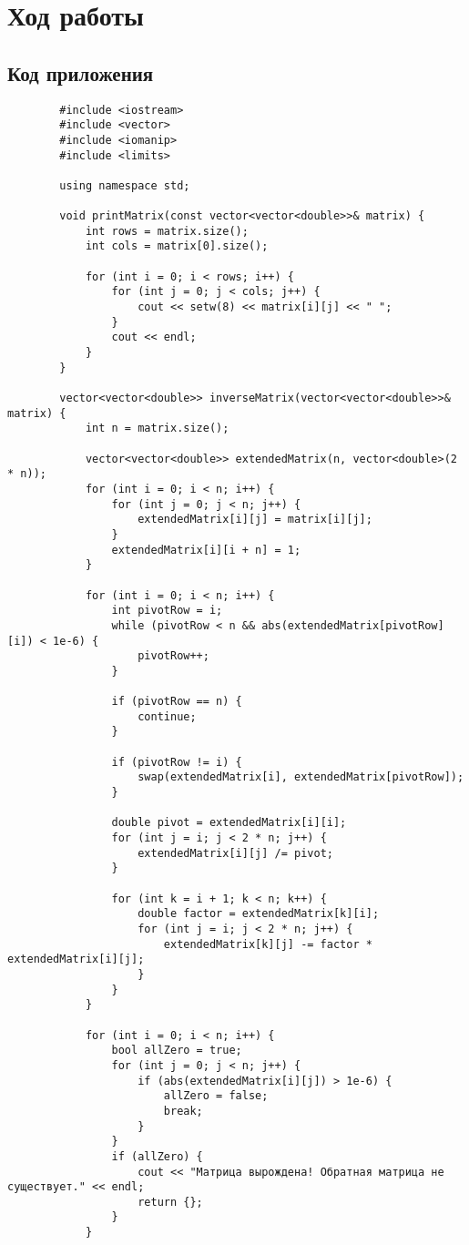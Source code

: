 \documentclass{article}
\begin{document}
	
	\section{Ход работы}
	\label{sec:exp}
	
	\subsection{Код приложения}
	\label{sec:exp:code}
	\begin{verbatim}
		#include <iostream>
		#include <vector>
		#include <iomanip>
		#include <limits>
		
		using namespace std;
		
		void printMatrix(const vector<vector<double>>& matrix) {
			int rows = matrix.size();
			int cols = matrix[0].size();
			
			for (int i = 0; i < rows; i++) {
				for (int j = 0; j < cols; j++) {
					cout << setw(8) << matrix[i][j] << " ";
				}
				cout << endl;
			}
		}
		
		vector<vector<double>> inverseMatrix(vector<vector<double>>& matrix) {
			int n = matrix.size();
			
			vector<vector<double>> extendedMatrix(n, vector<double>(2 * n));
			for (int i = 0; i < n; i++) {
				for (int j = 0; j < n; j++) {
					extendedMatrix[i][j] = matrix[i][j];
				}
				extendedMatrix[i][i + n] = 1;
			}
			
			for (int i = 0; i < n; i++) {
				int pivotRow = i;
				while (pivotRow < n && abs(extendedMatrix[pivotRow][i]) < 1e-6) {
					pivotRow++;
				}
				
				if (pivotRow == n) {
					continue;
				}
				
				if (pivotRow != i) {
					swap(extendedMatrix[i], extendedMatrix[pivotRow]);
				}
				
				double pivot = extendedMatrix[i][i];
				for (int j = i; j < 2 * n; j++) {
					extendedMatrix[i][j] /= pivot;
				}
				
				for (int k = i + 1; k < n; k++) {
					double factor = extendedMatrix[k][i];
					for (int j = i; j < 2 * n; j++) {
						extendedMatrix[k][j] -= factor * extendedMatrix[i][j];
					}
				}
			}
			
			for (int i = 0; i < n; i++) {
				bool allZero = true;
				for (int j = 0; j < n; j++) {
					if (abs(extendedMatrix[i][j]) > 1e-6) {
						allZero = false;
						break;
					}
				}
				if (allZero) {
					cout << "Матрица вырождена! Обратная матрица не существует." << endl;
					return {};
				}
			}
			

\end{verbatim}
\end{document}
